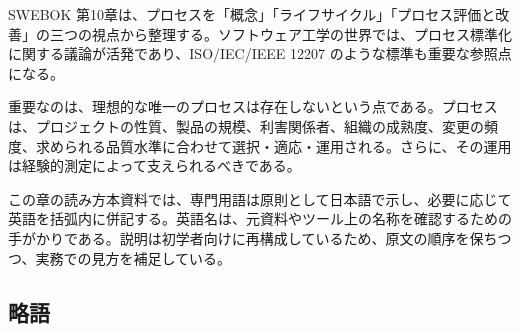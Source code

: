 \documentclass[a4paper,11pt]{ltjsarticle}
\numberwithin{figure}{section}
\numberwithin{table}{section}
\begin{document}
SWEBOK 第10章は、プロセスを「概念」「ライフサイクル」「プロセス評価と改善」の三つの視点から整理する。ソフトウェア工学の世界では、プロセス標準化に関する議論が活発であり、ISO/IEC/IEEE 12207 のような標準も重要な参照点になる。

重要なのは、理想的な唯一のプロセスは存在しないという点である。プロセスは、プロジェクトの性質、製品の規模、利害関係者、組織の成熟度、変更の頻度、求められる品質水準に合わせて選択・適応・運用される。さらに、その運用は経験的測定によって支えられるべきである。

\begin{pointbox}{この章の読み方}本資料では、専門用語は原則として日本語で示し、必要に応じて英語を括弧内に併記する。英語名は、元資料やツール上の名称を確認するための手がかりである。説明は初学者向けに再構成しているため、原文の順序を保ちつつ、実務での見方を補足している。\end{pointbox}
\subsection{略語}
\end{document}
